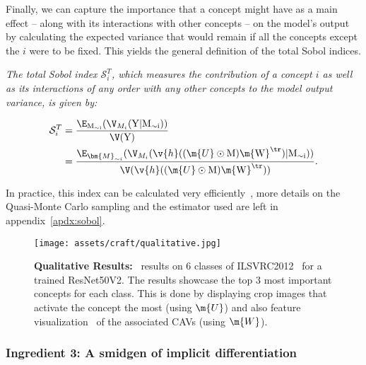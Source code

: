 Finally, we can capture the importance that a concept might have as a main effect -- along with its interactions with other concepts -- on the model's output by calculating the expected variance that would remain if all the concepts except the $i$ were to be fixed. This yields the general definition of the total Sobol indices.


\begin{definition}
\textit{The total Sobol index $\mathcal{S}^T_i$, which measures the contribution of a concept $i$ as well as its interactions of any order with any other concepts to the model output variance, is given by:}

\begin{align}
\label{eq:craft:total_sobol}
\mathcal{S}^T_i 
& = \frac{ \E_{\rm{M}_{\sim i}}( \V_{M_i} ( \rm{Y} | \rm{M}_{\sim i} )) }{ \V(\rm{Y}) } \\
& = \frac{ \E_{\bm{M}_{\sim i}}( \V_{M_i} ( \v{h}((\m{U} \odot \rm{M})\m{W}^\tr) | \rm{M}_{\sim i} )) }{ \V( \v{h}((\m{U} \odot \rm{M})\m{W}^\tr)) }.
\end{align}
\end{definition}



In practice, this index can be calculated very efficiently~\cite{saltelli2010variance, marrel2009calculations, janon2014asymptotic, owen2013better, tarantola2006random}, more details on the Quasi-Monte Carlo sampling and the estimator used are left in appendix~\ref{apdx:sobol}.


\begin{figure*}[ht]
\centering
\texttt{[image: assets/craft/qualitative.jpg]}
\caption{
\textbf{Qualitative Results:} \craft~results on 6 classes of ILSVRC2012~\cite{imagenet_cvpr09} for a trained ResNet50V2. The results showcase the top 3 most important concepts for each class. This is done by displaying crop images that activate the concept the most (using $\m{U}$) and also feature visualization~\cite{olah2017feature} of the associated CAVs (using $\m{W}$). 
}
\label{fig:craft:qualitative}
\end{figure*}

\subsubsection{Ingredient 3: A smidgen of implicit differentiation}\label{subsec:cam}


